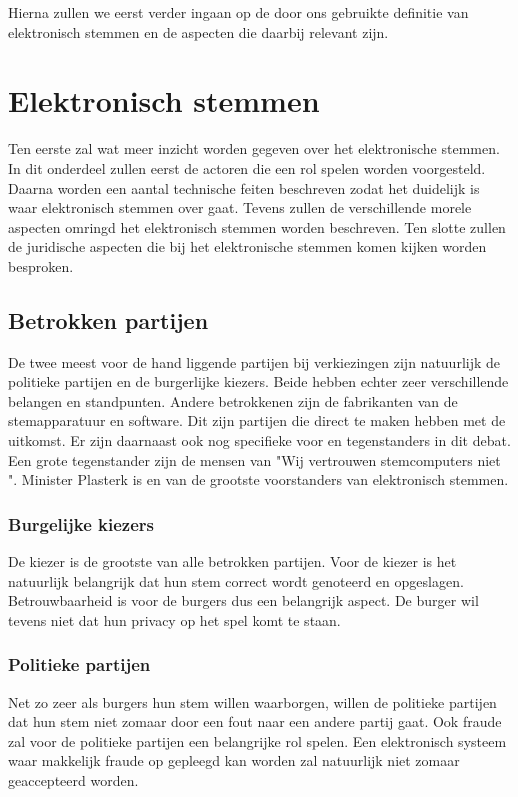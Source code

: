 \documentclass[a4paper]{article}
\begin{document}
Hierna zullen we eerst verder ingaan op de door ons gebruikte definitie van elektronisch stemmen en de aspecten die daarbij relevant zijn.

\section{Elektronisch stemmen}

Ten eerste zal wat meer inzicht worden gegeven over het elektronische stemmen. 
In dit onderdeel zullen eerst de actoren die een rol spelen worden voorgesteld. 
Daarna worden een aantal technische feiten beschreven zodat het duidelijk is waar elektronisch stemmen over gaat.
Tevens zullen de verschillende morele aspecten omringd het elektronisch stemmen worden beschreven.
Ten slotte zullen de juridische aspecten die bij het elektronische stemmen komen kijken worden besproken.

\subsection{Betrokken partijen}

De twee meest voor de hand liggende partijen bij verkiezingen zijn natuurlijk de politieke partijen en de burgerlijke kiezers. 
Beide hebben echter zeer verschillende belangen en standpunten. 
Andere betrokkenen zijn de fabrikanten van de stemapparatuur en software.
Dit zijn partijen die direct te maken hebben met de uitkomst.
Er zijn daarnaast ook nog specifieke voor en tegenstanders in dit debat.
Een grote tegenstander zijn de mensen van "Wij vertrouwen stemcomputers niet ".
Minister Plasterk is en van de grootste voorstanders van elektronisch stemmen.
 
\subsubsection{Burgelijke kiezers}
De kiezer is de grootste van alle betrokken partijen.
Voor de kiezer is het natuurlijk belangrijk dat hun stem correct wordt genoteerd en opgeslagen. 
Betrouwbaarheid is voor de burgers dus een belangrijk aspect.
De burger wil tevens niet dat hun privacy op het spel komt te staan.
 
\subsubsection{Politieke partijen}
Net zo zeer als burgers hun stem willen waarborgen, willen de politieke partijen dat hun stem niet zomaar door een fout naar een andere partij gaat.
Ook fraude zal voor de politieke partijen een belangrijke rol spelen. 
Een elektronisch systeem waar makkelijk fraude op gepleegd kan worden zal natuurlijk niet zomaar geaccepteerd worden.
\end{document}

